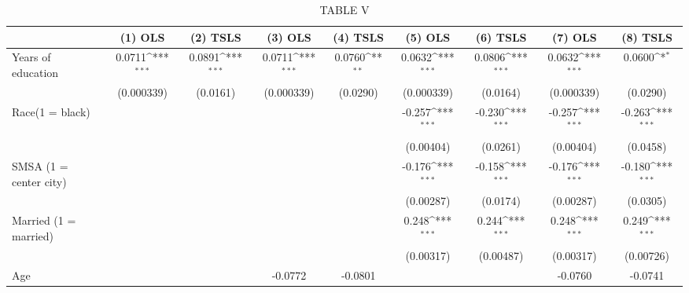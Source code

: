 \begin{table}[htbp]\centering
\def\sym#1{\ifmmode^{#1}\else\(^{#1}\)\fi}
\caption{TABLE V}
\begin{tabular}{l*{8}{c}}
\hline\hline
                         &\multicolumn{1}{c}{(1) OLS}&\multicolumn{1}{c}{(2) TSLS}&\multicolumn{1}{c}{(3) OLS}&\multicolumn{1}{c}{(4) TSLS}&\multicolumn{1}{c}{(5) OLS}&\multicolumn{1}{c}{(6) TSLS}&\multicolumn{1}{c}{(7) OLS}&\multicolumn{1}{c}{(8) TSLS}\\
\hline
Years of education       &      0.0711\sym{***}&      0.0891\sym{***}&      0.0711\sym{***}&      0.0760\sym{**} &      0.0632\sym{***}&      0.0806\sym{***}&      0.0632\sym{***}&      0.0600\sym{*}  \\
                         &  (0.000339)         &    (0.0161)         &  (0.000339)         &    (0.0290)         &  (0.000339)         &    (0.0164)         &  (0.000339)         &    (0.0290)         \\
[1em]
Race(1 = black)          &                     &                     &                     &                     &      -0.257\sym{***}&      -0.230\sym{***}&      -0.257\sym{***}&      -0.263\sym{***}\\
                         &                     &                     &                     &                     &   (0.00404)         &    (0.0261)         &   (0.00404)         &    (0.0458)         \\
[1em]
SMSA (1 = center city)   &                     &                     &                     &                     &      -0.176\sym{***}&      -0.158\sym{***}&      -0.176\sym{***}&      -0.180\sym{***}\\
                         &                     &                     &                     &                     &   (0.00287)         &    (0.0174)         &   (0.00287)         &    (0.0305)         \\
[1em]
Married (1 = married)    &                     &                     &                     &                     &       0.248\sym{***}&       0.244\sym{***}&       0.248\sym{***}&       0.249\sym{***}\\
                         &                     &                     &                     &                     &   (0.00317)         &   (0.00487)         &   (0.00317)         &   (0.00726)         \\
[1em]
Age                      &                     &                     &     -0.0772         &     -0.0801         &                     &                     &     -0.0760         &     -0.0741         \\

\end{tabular}
\end{table}
